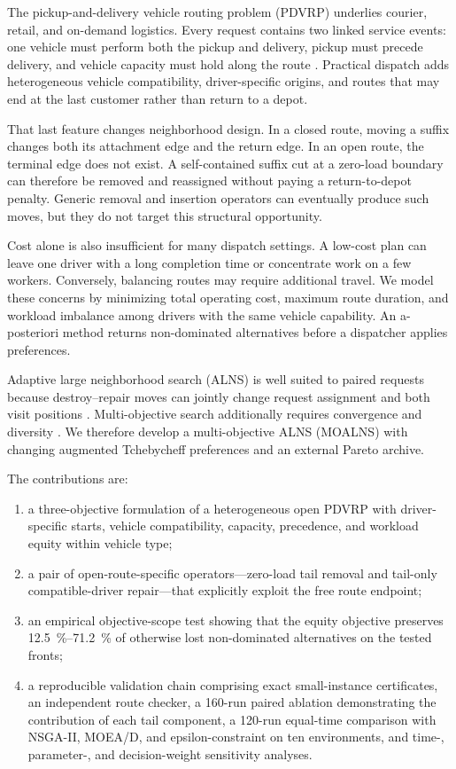 \documentclass[11pt,a4paper]{article}
\newcommand{\MOALNS}{MOALNS}
\begin{document}
The pickup-and-delivery vehicle routing problem (PDVRP) underlies courier,
retail, and on-demand logistics. Every request contains two linked service
events: one vehicle must perform both the pickup and delivery, pickup must
precede delivery, and vehicle capacity must hold along the route
\cite{savelsbergh1995general}. Practical dispatch adds heterogeneous vehicle
compatibility, driver-specific origins, and routes that may end at the last
customer rather than return to a depot.

That last feature changes neighborhood design. In a closed route, moving a
suffix changes both its attachment edge and the return edge. In an open route,
the terminal edge does not exist. A self-contained suffix cut at a zero-load
boundary can therefore be removed and reassigned without paying a
return-to-depot penalty. Generic removal and insertion operators can eventually
produce such moves, but they do not target this structural opportunity.

Cost alone is also insufficient for many dispatch settings. A low-cost plan can
leave one driver with a long completion time or concentrate work on a few
workers. Conversely, balancing routes may require additional travel. We model
these concerns by minimizing total operating cost, maximum route duration, and
workload imbalance among drivers with the same vehicle capability. An
a-posteriori method returns non-dominated alternatives before a dispatcher
applies preferences.

Adaptive large neighborhood search (ALNS) is well suited to paired requests
because destroy--repair moves can jointly change request assignment and both
visit positions \cite{ropke2006alns}. Multi-objective search additionally
requires convergence and diversity \cite{jozefowiez2008multi}. We therefore
develop a multi-objective ALNS (\MOALNS{}) with changing augmented Tchebycheff
preferences and an external Pareto archive.

The contributions are:
\begin{enumerate}[leftmargin=*,itemsep=2pt]
  \item a three-objective formulation of a heterogeneous open PDVRP with
  driver-specific starts, vehicle compatibility, capacity, precedence, and
  workload equity within vehicle type;
  \item a pair of open-route-specific operators---zero-load tail removal and
  tail-only compatible-driver repair---that explicitly exploit the free route
  endpoint;
  \item an empirical objective-scope test showing that the equity objective
  preserves \SIrange{12.5}{71.2}{\percent} of otherwise lost non-dominated
  alternatives on the tested fronts;
  \item a reproducible validation chain comprising exact small-instance
  certificates, an independent route checker, a 160-run paired ablation
  demonstrating the contribution of each tail component, a 120-run equal-time
  comparison with NSGA-II, MOEA/D, and epsilon-constraint on ten environments,
  and time-, parameter-, and decision-weight sensitivity analyses.
\end{enumerate}
\end{document}
